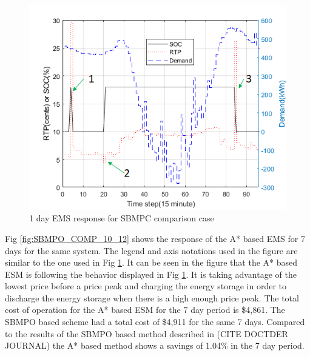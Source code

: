   \begin{figure}[!ht]
    \centering
    \includegraphics[width = \linewidth]{figs/SBMPO_COMP_1_day.png}
    \caption{1 day EMS response for SBMPC comparison case}
    \label{fig:SBMPO_COMP_1_day}
\end{figure}

 Fig \ref{fig:SBMPO_COMP_10_12} shows the response of the A* based EMS for 7 days for the same system. The legend and axis notations used in the figure are similar to the one used in Fig \ref{fig:SBMPO_COMP_1_day}. It can be seen in the figure that the A* based ESM is following the behavior displayed in Fig \ref{fig:SBMPO_COMP_1_day}. It is taking advantage of the lowest price before a price peak and charging the energy storage in order to discharge the energy storage when there is a high enough price peak. The total cost of operation for the A* based ESM for the 7 day period is \$4,861. The SBMPO based scheme had a total cost of \$4,911 for the same 7 days. Compared to the results of the SBMPO based method described in \colorbox{BurntOrange}{(CITE DOCTDER JOURNAL)} the A* based method shows a savings of 1.04\% in the 7 day period.
 

